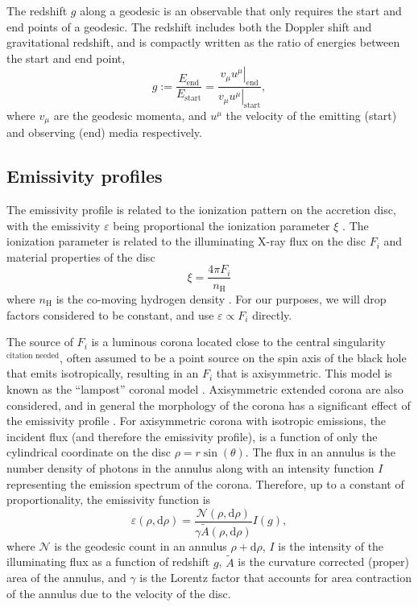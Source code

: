 \documentclass[fleqn,usenatbib]{mnras}
\newcommand{\citneeded}{{\bf \color{red} $^{\text{citation needed}}$}}
\renewcommand{\d}{\text{d}}
\begin{document}
The redshift $g$ along a geodesic is an observable that only requires the start
and end points of a geodesic. The redshift includes both the Doppler shift and
gravitational redshift, and is compactly written as the ratio of energies
between the start and end point,
\begin{equation}
\label{eq:redshift}
g := \frac{E_\text{end}}{E_\text{start}} = \frac{\left. v_\mu u^\mu
\right\rvert_\text{end}}{\left. v_\mu u^\mu \right\rvert_{\text{start}}},
\end{equation}
where $v_\mu$ are the geodesic momenta, and $u^\mu$ the velocity of the emitting
(start) and observing (end) media respectively.



\subsection{Emissivity profiles}
\label{sec:emissivity-profiles}

The emissivity profile is related to the ionization pattern on the accretion
disc, with the emissivity $\varepsilon$ being proportional the ionization
parameter $\xi$ \citep{laor_line_1991,wilkins_understanding_2012}. The
ionization parameter is related to the illuminating X-ray flux on the disc $F_i$
and material properties of the disc
\begin{equation}
    \xi = \frac{4 \pi F_i}{n_\text{H}}
\end{equation}
where $n_\text{H}$ is the co-moving hydrogen density \citep{ross_effects_1993}.
For our purposes, we will drop factors considered to be constant, and use
$\varepsilon \propto F_i$ directly.

The source of $F_i$ is a luminous corona located close to the central
singularity\citneeded, often assumed to be a point source on the spin axis of
the black hole that emits isotropically, resulting in an $F_i$ that is
axisymmetric. This model is known as the ``lampost'' coronal model
\citep{fukumura_accretion_2007}. Axisymmetric extended corona are also
considered, and in general the morphology of the corona has a significant effect
of the emissivity profile \citep{wilkins_towards_2016, gonzalez_probing_2017}.
For axisymmetric corona with isotropic emissions, the incident flux (and
therefore the emissivity profile), is a function of only the cylindrical
coordinate on the disc $\rho = r \sin(\theta)$. The flux in an annulus is the
number density of photons in the annulus along with an intensity function $I$
representing the emission spectrum of the corona.  Therefore, up to a constant
of proportionality, the emissivity function is
\begin{equation}
    \varepsilon (\rho, \d \rho) = \frac{\mathcal{N}(\rho, \d \rho)}{\gamma
    \tilde{A}(\rho, \d \rho)} I(g),
\end{equation}
where $\mathcal{N}$ is the geodesic count in an annulus $\rho + \d \rho$, $I$ is
the intensity of the illuminating flux as a function of redshift $g$,
$\tilde{A}$ is the curvature corrected (proper) area of the annulus, and
$\gamma$ is the Lorentz factor that accounts for area contraction of the annulus
due to the velocity of the disc.
\end{document}
